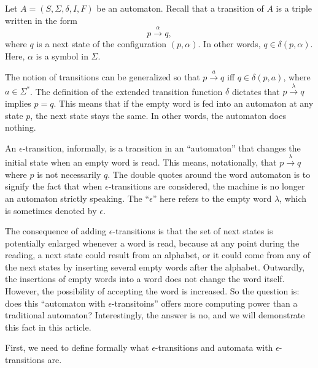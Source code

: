 \documentclass[12pt]{article}
\begin{document}
Let $A=(S,\Sigma,\delta,I,F)$ be an automaton.  Recall that a transition of $A$ is a triple written in the form $$p \stackrel{\alpha}{\longrightarrow} q,$$ where $q$ is a next state of the configuration $(p,\alpha)$.  In other words, $q\in \delta(p,\alpha)$.  Here, $\alpha$ is a symbol in $\Sigma$.  

The notion of transitions can be generalized so that $p\stackrel{a}{\longrightarrow} q$ iff $q\in \delta(p,a)$, where $a\in \Sigma^*$.  The definition of the extended transition function $\delta$ dictates that $p\stackrel{\lambda}{\longrightarrow} q$ implies $p=q$.  This means that if the empty word is fed into an automaton at any state $p$, the next state stays the same.  In other words, the automaton does nothing.

An $\epsilon$-transition, informally, is a transition in an ``automaton'' that changes the initial state when an empty word is read.  This means, notationally, that $p\stackrel{\lambda}{\longrightarrow} q$ where $p$ is not necessarily $q$.  The double quotes around the word automaton is to signify the fact that when $\epsilon$-transitions are considered, the machine is no longer an automaton strictly speaking.  The ``$\epsilon$'' here refers to the empty word $\lambda$, which is sometimes denoted by $\epsilon$.

The consequence of adding $\epsilon$-transitions is that the set of next states is potentially enlarged whenever a word is read, because at any point during the reading, a next state could result from an alphabet, or it could come from any of the next states by inserting several empty words after the alphabet.  Outwardly, the insertions of empty words into a word does not change the word itself.  However, the possibility of accepting the word is increased.  So the question is: does this ``automaton with $\epsilon$-transitoins'' offers more computing power than a traditional automaton?  Interestingly, the answer is no, and we will demonstrate this fact in this article.

First, we need to define formally what $\epsilon$-transitions and automata with $\epsilon$-transitions are.
\end{document}
